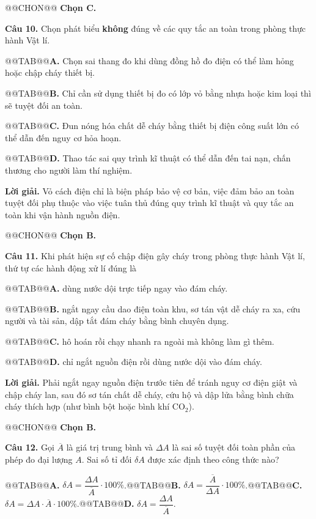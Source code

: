\documentclass{article}
\begin{document}
@@CHON@@ \textbf{Chọn C.}

\textbf{Câu 10.} Chọn phát biểu \textbf{không} đúng về các quy tắc an toàn trong phòng thực hành Vật lí.

@@TAB@@\textbf{A.} Chọn sai thang đo khi dùng đồng hồ đo điện có thể làm hỏng hoặc chập cháy thiết bị.

@@TAB@@\textbf{B.} Chỉ cần sử dụng thiết bị đo có lớp vỏ bằng nhựa hoặc kim loại thì sẽ tuyệt đối an toàn.

@@TAB@@\textbf{C.} Đun nóng hóa chất dễ cháy bằng thiết bị điện công suất lớn có thể dẫn đến nguy cơ hỏa hoạn.

@@TAB@@\textbf{D.} Thao tác sai quy trình kĩ thuật có thể dẫn đến tai nạn, chấn thương cho người làm thí nghiệm.

\textbf{Lời giải.} Vỏ cách điện chỉ là biện pháp bảo vệ cơ bản, việc đảm bảo an toàn tuyệt đối phụ thuộc vào việc tuân thủ đúng quy trình kĩ thuật và quy tắc an toàn khi vận hành nguồn điện.

@@CHON@@ \textbf{Chọn B.}

\textbf{Câu 11.} Khi phát hiện sự cố chập điện gây cháy trong phòng thực hành Vật lí, thứ tự các hành động xử lí đúng là

@@TAB@@\textbf{A.} dùng nước dội trực tiếp ngay vào đám cháy.

@@TAB@@\textbf{B.} ngắt ngay cầu dao điện toàn khu, sơ tán vật dễ cháy ra xa, cứu người và tài sản, dập tắt đám cháy bằng bình chuyên dụng.

@@TAB@@\textbf{C.} hô hoán rồi chạy nhanh ra ngoài mà không làm gì thêm.

@@TAB@@\textbf{D.} chỉ ngắt nguồn điện rồi dùng nước dội vào đám cháy.

\textbf{Lời giải.} Phải ngắt ngay nguồn điện trước tiên để tránh nguy cơ điện giật và chập cháy lan, sau đó sơ tán chất dễ cháy, cứu hộ và dập lửa bằng bình chữa cháy thích hợp (như bình bột hoặc bình khí $\text{CO}_2$).

@@CHON@@ \textbf{Chọn B.}

\textbf{Câu 12.} Gọi $\overline{A}$ là giá trị trung bình và $\Delta A$ là sai số tuyệt đối toàn phần của phép đo đại lượng $A$. Sai số tỉ đối $\delta A$ được xác định theo công thức nào?

@@TAB@@\textbf{A.} $\delta A = \dfrac{\Delta A}{\overline{A}} \cdot 100\%$.@@TAB@@\textbf{B.} $\delta A = \dfrac{\overline{A}}{\Delta A} \cdot 100\%$.@@TAB@@\textbf{C.} $\delta A = \Delta A \cdot \overline{A} \cdot 100\%$.@@TAB@@\textbf{D.} $\delta A = \dfrac{\Delta A}{\overline{A}}$.
\end{document}
